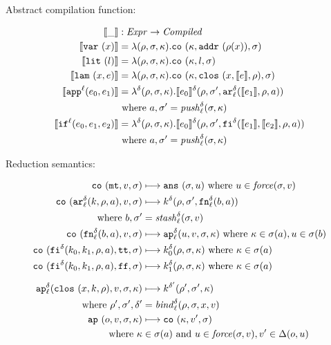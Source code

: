 \documentclass{llncs}
\begin{document}
Abstract compilation function:

\begin{align*}
\compile{\_} &: \Expr \to \Compiled \\
\compile{\svar\mvar} &= \lambda(\menv,\msto,\mkont) .\co{\mkont,\saddr{\menv(\mvar)},\msto}
\\
\compile{\slit\mlit} &= \lambda(\menv,\msto,\mkont) .
\co{\mkont,\mlit,\msto}
\\
\compile{\slam\mvar\mexp} &= \lambda(\menv,\msto,\mkont) .
\co{\mkont,\clos{\mvar,\compile\mexp,\menv},\msto}
\\
\compile{\sapp[^\mlab]{\mexpi0}{\mexpi1}} &= \lambda^\mcntr (\menv,\msto,\mkont) .
\compile{\mexpi0}^\mcntr(\menv,\msto',\kar[_\mlab^\mcntr]{\compile{\mexpi1},\menv,\maddr})
\\
&
\text{ where }\maddr,\msto' = \push^\mcntr_\mlab(\msto,\mkont)
\\
\compile{\sif[^\mlab]{\mexpi0}{\mexpi1}{\mexpi2}} &= \lambda^\mcntr(\menv,\msto,\mkont) .
\compile{\mexpi0}^\delta(\menv,\msto',\kif[^\mcntr]{\compile{\mexpi1},\compile{\mexpi2},\menv,\maddr})
\\
&\text{ where }\maddr,\msto' = \push_\mlab^\mcntr(\msto,\mkont)
\end{align*}

Reduction semantics:

\begin{gather*}
\begin{align*}
\co{\kmt,\mval,\msto} &\machstep
\ans{\msto,\mvalx{u}}
\text{ where } \mvalx{u} \in \force(\msto,\mval)
\\
\co{\kar[^\mcntr_\mlab]{\mcomp,\menv,\maddr},\mval,\msto} & \machstep
\mcomp^\mcntr(\menv,\msto',\kfn[^\mcntr_\mlab]{\maddralt,\maddr})
\\
\text{ where }\maddralt,\msto' &= \stash_\mlab^\mcntr(\msto,\mval)
\\
\co{\kfn[^\mcntr_\mlab]{\maddralt,\maddr},\mval,\msto} & \machstep
\ap[^\mcntr_\mlab]{\mvalx{u},\mval,\msto,\mkont}
\text{ where } \mkont \in \msto(\maddr), \mvalx{u} \in \msto(\maddralt)
\\
\co{\kif[^\mcntr]{\mcompi0,\mcompi1,\menv,\maddr},\strue,\msto} & \machstep
\mcompi0^\mcntr(\menv,\msto,\mkont)
\text{ where }\mkont\in\msto(\maddr)
\\
\co{\kif[^\mcntr]{\mcompi0,\mcompi1,\menv,\maddr},\sfalse,\msto} & \machstep
\mcompi1^\mcntr(\menv,\msto,\mkont)
\text{ where }\mkont\in\msto(\maddr)
\\[2mm]
\ap[^\mcntr_\mlab]{\clos{\mvar,\mcomp,\menv},\mval,\msto,\mkont} & \machstep
\mcomp^{\mcntr'}(\menv',\msto',\mkont) \\
\text{ where }\menv',\msto',\mcntr' &= \bind^\mcntr_\mlab(\menv,\msto,\mvar,\mval)
\\
\ap{\mop,\mval,\msto,\mkont} & \machstep
\co{\mkont,\mval',\msto} \\
\text{ where }\mkont &\in\msto(\maddr)
\text{ and } \mvalx{u} \in \force(\msto,\mval), \mval'\in\interpdelta(\mop,\mvalx{u})
\end{align*}
\end{gather*}
\end{document}
